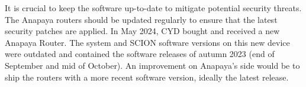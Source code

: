 It is crucial to keep the software up-to-date to mitigate potential security threats.
The Anapaya routers should be updated regularly to ensure that the latest security patches are applied.
In May 2024, CYD bought and received a new Anapaya Router.
The system and SCION software versions on this new device were outdated and contained the software releases of autumn 2023 (end of September and mid of October).
An improvement on Anapaya's side would be to ship the routers with a more recent software version, ideally the latest release.
